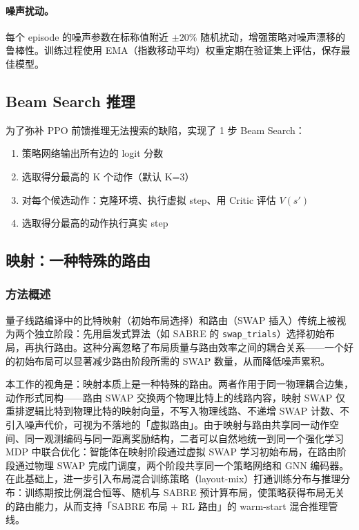 \paragraph{噪声扰动。} 每个 episode 的噪声参数在标称值附近 $\pm 20\%$ 随机扰动，增强策略对噪声漂移的鲁棒性。训练过程使用 EMA（指数移动平均）权重定期在验证集上评估，保存最佳模型。

\subsection{Beam Search 推理}

为了弥补 PPO 前馈推理无法搜索的缺陷，实现了 1 步 Beam Search：
\begin{enumerate}
  \item 策略网络输出所有边的 logit 分数
  \item 选取得分最高的 K 个动作（默认 K=3）
  \item 对每个候选动作：克隆环境、执行虚拟 step、用 Critic 评估 $V(s')$
  \item 选取得分最高的动作执行真实 step
\end{enumerate}

\subsection{映射：一种特殊的路由}
\label{sec:mapping-as-routing}

\subsubsection{方法概述}

量子线路编译中的比特映射（初始布局选择）和路由（SWAP 插入）传统上被视为两个独立阶段：先用启发式算法（如 SABRE 的 \texttt{swap\_trials}）选择初始布局，再执行路由。这种分离忽略了布局质量与路由效率之间的耦合关系——一个好的初始布局可以显著减少路由阶段所需的 SWAP 数量，从而降低噪声累积。

本工作的视角是：映射本质上是一种特殊的路由。两者作用于同一物理耦合边集，动作形式同构——路由 SWAP 交换两个物理比特上的线路内容，映射 SWAP 仅重排逻辑比特到物理比特的映射向量，不写入物理线路、不递增 SWAP 计数、不引入噪声代价，可视为不落地的「虚拟路由」。由于映射与路由共享同一动作空间、同一观测编码与同一距离奖励结构，二者可以自然地统一到同一个强化学习 MDP 中联合优化：智能体在映射阶段通过虚拟 SWAP 学习初始布局，在路由阶段通过物理 SWAP 完成门调度，两个阶段共享同一个策略网络和 GNN 编码器。在此基础上，进一步引入布局混合训练策略（layout-mix）打通训练分布与推理分布：训练期按比例混合恒等、随机与 SABRE 预计算布局，使策略获得布局无关的路由能力，从而支持「SABRE 布局 + RL 路由」的 warm-start 混合推理管线。

